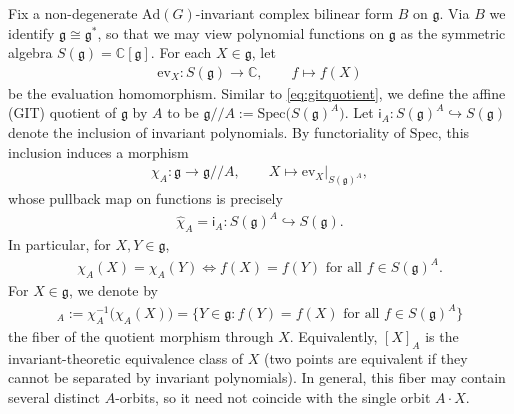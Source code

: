 \documentclass[11pt,reqno]{amsart}
\newtheorem*{theorem A}{Main Theorem A}
\newtheorem*{theorem B}{Main Theorem B}
\newtheorem*{theorem C}{Main Theorem C}
\newtheorem*{theorem D}{Main Theorem D}
\theoremstyle{definition}
\theoremstyle{plain}
\theoremstyle{conclusion}
\begin{document}
Fix a non-degenerate $\mathrm{Ad}(G)$-invariant complex bilinear form $B$ on $\mathfrak{g}$. Via $B$ we identify $\mathfrak{g}\cong\mathfrak{g}^*$, so that we may view polynomial functions on $\mathfrak{g}$ as the symmetric algebra $S(\mathfrak{g})=\mathbb{C}[\mathfrak{g}]$. For each $X\in\mathfrak{g}$, let
\begin{align*}
\mathrm{ev}_X:S(\mathfrak{g})\to\mathbb{C},\qquad f\longmapsto f(X)
\end{align*}
be the evaluation homomorphism. Similar to \eqref{eq:gitquotient}, we define the affine (GIT) quotient of $\mathfrak{g}$ by $A$ to be $\mathfrak{g}//A:=\mathrm{Spec}\bigl(S(\mathfrak{g})^A\bigr)$. Let $\mathsf{i}_A:S(\mathfrak{g})^A \hookrightarrow S(\mathfrak{g})$ denote the inclusion of invariant polynomials. By functoriality of $\mathrm{Spec}$, this inclusion induces a morphism
\begin{align}
\chi_A: \mathfrak{g}  \longrightarrow   \mathfrak{g}//A, \qquad X\longmapsto \mathrm{ev}_X\vert_{S(\mathfrak{g})^A},  \label{eq:canonicalpro}
\end{align}
whose pullback map on functions is precisely \begin{align*}
\widehat{\chi}_A = \mathsf{i}_A:S(\mathfrak{g})^A\hookrightarrow S(\mathfrak{g}).
\end{align*} In particular, for $X,Y\in\mathfrak{g}$, \begin{align*}
\chi_A(X) = \chi_A(Y) \Longleftrightarrow f(X)=f(Y)\text{ for all }f\in S(\mathfrak{g})^A.
\end{align*} For $X\in\mathfrak{g}$, we denote by \begin{align}
[X]_A :=\chi_A^{-1}\bigl(\chi_A(X)\bigr) =\{Y\in\mathfrak{g}: f(Y)=f(X)\text{ for all }f\in S(\mathfrak{g})^A\} \label{eq:pointsinquo}
\end{align} the fiber of the quotient morphism through $X$. Equivalently, $[X]_A$ is the invariant-theoretic equivalence class of $X$ (two points are equivalent if they cannot be separated by invariant polynomials). In general, this fiber may contain several distinct $A$-orbits, so it need not coincide with the single orbit $A\cdot X$.
\end{document}
